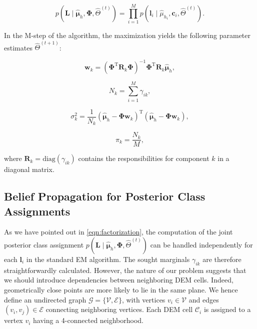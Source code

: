 \begin{equation}
\label{eqn:factorization}
p(\mathbf{L}\mid\hat{\boldsymbol\mu}_h,\boldsymbol{\Phi},\hat{\Theta}^{(t)})
=\prod_{i=1}^M p(\mathbf{l}_i\mid\hat{\mu}_{h_i},\mathbf{c}_i,
\hat{\Theta}^{(t)}).
\end{equation}

In the M-step of the algorithm, the maximization yields the following parameter
estimates $\hat{\Theta}^{(t+1)}$:

\begin{equation}
\label{eqn:coeff}
\mathbf{w}_k = (\boldsymbol{\Phi}^\text{T}\mathbf{R}_k\boldsymbol{\Phi})^{-1}
\boldsymbol{\Phi}^\text{T}\mathbf{R}_k\hat{\boldsymbol\mu}_h,
\end{equation}

\begin{equation}
\label{eqn:numpoints}
N_k = \sum_{i=1}^M\gamma_{ik},
\end{equation}

\begin{equation}
\label{eqn:var}
\sigma^2_k = \frac{1}{N_k}(\hat{\boldsymbol\mu}_h-\boldsymbol{\Phi}
\mathbf{w}_k)^\text{T}(\hat{\boldsymbol\mu}_h-\boldsymbol{\Phi}\mathbf{w}_k),
\end{equation}

\begin{equation}
\label{eqn:weights}
\pi_k = \frac{N_k}{M},
\end{equation}

where $\mathbf{R}_k=\text{diag}(\gamma_{ik})$ contains the responsibilities for
component $k$ in a diagonal matrix.

\subsection{Belief Propagation for Posterior Class Assignments}

As we have pointed out in \eqref{eqn:factorization}, the computation of the
joint posterior class assignment
$p(\mathbf{L}\mid\hat{\boldsymbol\mu}_h,\boldsymbol{\Phi},\hat{\Theta}^{(t)})$
can be handled independently for each $\mathbf{l}_i$ in the standard EM
algorithm. The sought marginals $\gamma_{ik}$ are therefore straightforwardly
calculated. However, the nature of our problem suggests that we should introduce
dependencies between neighboring DEM cells. Indeed, geometrically close points
are more likely to lie in the same plane. We hence define an undirected graph
$\mathcal{G}=\{\mathcal{V},\mathcal{E}\}$, with vertices $v_i\in\mathcal{V}$ and
edges $(v_i,v_j)\in\mathcal{E}$ connecting neighboring vertices. Each DEM cell
$\mathcal{C}_i$ is assigned to a vertex $v_i$ having a 4-connected neighborhood.

